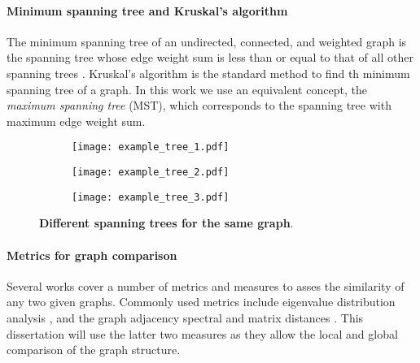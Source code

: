 \paragraph*{Minimum spanning tree and Kruskal's algorithm}
The minimum spanning tree of an undirected, connected, and weighted graph is the spanning tree whose edge weight sum is less than or equal to that of all other spanning trees \cite{Sefidgarminimumspanningtree}. Kruskal's algorithm \cite{Kershenbaum1972Computingminimumspanning} is the standard method to find th minimum spanning tree of a graph. In this work we use an equivalent concept, the \emph{maximum spanning tree} (MST), which corresponds to the spanning tree with maximum edge weight sum.
\begin{figure*}[!t]
	\centering	
	\hspace*{\fill}
	\begin{subfigure}[t]{0.32\textwidth}
		\subcaption{}
		\texttt{[image: example\_tree\_1.pdf]}
		\label{fig:example_tree_1}
	\end{subfigure}	
	\hfill
	\begin{subfigure}[t]{0.32\textwidth}
		\subcaption{}
		\texttt{[image: example\_tree\_2.pdf]}
		\label{fig:example_tree_2}
	\end{subfigure}
	\hfill
	\begin{subfigure}[t]{0.32\textwidth}
		\subcaption{}
		\texttt{[image: example\_tree\_3.pdf]}
		\label{fig:example_tree_3}
	\end{subfigure}	
	\hspace*{\fill}	
	\caption[] {\label{fig:tree_examples} \textbf{Different spanning trees for the same graph}.}
\end{figure*}

\paragraph*{Metrics for graph comparison}
Several works cover a number of metrics and measures to asses the similarity of any two given graphs. Commonly used metrics include eigenvalue distribution analysis \cite{Crawford2017GraphStructureSimilarity,Gera2018Identifyingnetworkstructure}, and the graph adjacency spectral and matrix distances \cite{Wills2020Metricsgraphcomparison}. This dissertation will use the latter two measures as they allow the local and global comparison of the graph structure.

